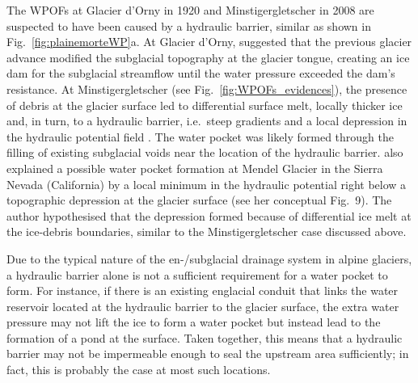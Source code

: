 The WPOFs at Glacier d'Orny in 1920 and Minstigergletscher in 2008 are suspected to have been caused by a hydraulic barrier, similar as shown in Fig.~\ref{fig:plainemorteWP}a. At Glacier d'Orny, \cite{Mercanton1921} suggested that the previous glacier advance modified the subglacial topography at the glacier tongue, creating an ice dam for the subglacial streamflow until the water pressure exceeded the dam's resistance. At Minstigergletscher (see Fig.~\ref{fig:WPOFs_evidences}), the presence of debris at the glacier surface led to differential surface melt, locally thicker ice and, in turn, to a hydraulic barrier, i.e.\  steep gradients and a local depression in the hydraulic potential field . The water pocket was likely formed through the filling of existing subglacial voids near the location of the hydraulic barrier. \cite{Konrad1998} also explained a possible water pocket formation at Mendel Glacier in the Sierra Nevada (California) by a local minimum in the hydraulic potential right below a topographic depression at the glacier surface (see her conceptual Fig.~9). The author hypothesised that the depression formed because of differential ice melt at the ice-debris boundaries, similar to the Minstigergletscher case discussed above. 

Due to the typical nature of the en-/subglacial drainage system in alpine glaciers, a hydraulic barrier alone is not a sufficient requirement for a water pocket to form. For instance, if there is an existing englacial conduit that links the water reservoir located at the hydraulic barrier to the glacier surface, the extra water pressure may not lift the ice to form a water pocket but instead lead to the formation of a pond at the surface. Taken together, this means that a hydraulic barrier may not be impermeable enough to seal the upstream area sufficiently; in fact, this is probably the case at most such locations.

